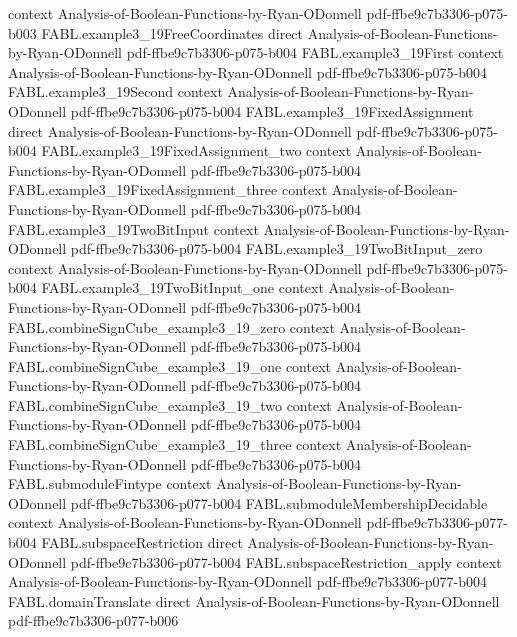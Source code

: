 \begin{theorem}
  {context}
  {Analysis-of-Boolean-Functions-by-Ryan-ODonnell}
  {pdf-ffbe9c7b3306-p075-b003}
\proofstep
  {FABL.example3_19FreeCoordinates}
  {direct}
  {Analysis-of-Boolean-Functions-by-Ryan-ODonnell}
  {pdf-ffbe9c7b3306-p075-b004}
\proofstep
  {FABL.example3_19First}
  {context}
  {Analysis-of-Boolean-Functions-by-Ryan-ODonnell}
  {pdf-ffbe9c7b3306-p075-b004}
\proofstep
  {FABL.example3_19Second}
  {context}
  {Analysis-of-Boolean-Functions-by-Ryan-ODonnell}
  {pdf-ffbe9c7b3306-p075-b004}
\proofstep
  {FABL.example3_19FixedAssignment}
  {direct}
  {Analysis-of-Boolean-Functions-by-Ryan-ODonnell}
  {pdf-ffbe9c7b3306-p075-b004}
\proofstep
  {FABL.example3_19FixedAssignment_two}
  {context}
  {Analysis-of-Boolean-Functions-by-Ryan-ODonnell}
  {pdf-ffbe9c7b3306-p075-b004}
\proofstep
  {FABL.example3_19FixedAssignment_three}
  {context}
  {Analysis-of-Boolean-Functions-by-Ryan-ODonnell}
  {pdf-ffbe9c7b3306-p075-b004}
\proofstep
  {FABL.example3_19TwoBitInput}
  {context}
  {Analysis-of-Boolean-Functions-by-Ryan-ODonnell}
  {pdf-ffbe9c7b3306-p075-b004}
\proofstep
  {FABL.example3_19TwoBitInput_zero}
  {context}
  {Analysis-of-Boolean-Functions-by-Ryan-ODonnell}
  {pdf-ffbe9c7b3306-p075-b004}
\proofstep
  {FABL.example3_19TwoBitInput_one}
  {context}
  {Analysis-of-Boolean-Functions-by-Ryan-ODonnell}
  {pdf-ffbe9c7b3306-p075-b004}
\proofstep
  {FABL.combineSignCube_example3_19_zero}
  {context}
  {Analysis-of-Boolean-Functions-by-Ryan-ODonnell}
  {pdf-ffbe9c7b3306-p075-b004}
\proofstep
  {FABL.combineSignCube_example3_19_one}
  {context}
  {Analysis-of-Boolean-Functions-by-Ryan-ODonnell}
  {pdf-ffbe9c7b3306-p075-b004}
\proofstep
  {FABL.combineSignCube_example3_19_two}
  {context}
  {Analysis-of-Boolean-Functions-by-Ryan-ODonnell}
  {pdf-ffbe9c7b3306-p075-b004}
\proofstep
  {FABL.combineSignCube_example3_19_three}
  {context}
  {Analysis-of-Boolean-Functions-by-Ryan-ODonnell}
  {pdf-ffbe9c7b3306-p075-b004}
\proofstep
  {FABL.submoduleFintype}
  {context}
  {Analysis-of-Boolean-Functions-by-Ryan-ODonnell}
  {pdf-ffbe9c7b3306-p077-b004}
\proofstep
  {FABL.submoduleMembershipDecidable}
  {context}
  {Analysis-of-Boolean-Functions-by-Ryan-ODonnell}
  {pdf-ffbe9c7b3306-p077-b004}
\proofstep
  {FABL.subspaceRestriction}
  {direct}
  {Analysis-of-Boolean-Functions-by-Ryan-ODonnell}
  {pdf-ffbe9c7b3306-p077-b004}
\proofstep
  {FABL.subspaceRestriction_apply}
  {context}
  {Analysis-of-Boolean-Functions-by-Ryan-ODonnell}
  {pdf-ffbe9c7b3306-p077-b004}
\proofstep
  {FABL.domainTranslate}
  {direct}
  {Analysis-of-Boolean-Functions-by-Ryan-ODonnell}
  {pdf-ffbe9c7b3306-p077-b006}

\end{theorem}
